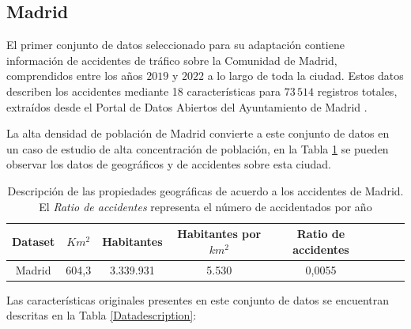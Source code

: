 \subsection*{Madrid}

El primer conjunto de datos seleccionado para su adaptación contiene información de accidentes de tráfico sobre la Comunidad de Madrid, comprendidos entre los años $2019$ y $2022$ a lo largo de toda la ciudad. Estos datos describen los accidentes mediante 18 características para $73\,514$ registros totales, extraídos desde el Portal de Datos Abiertos del Ayuntamiento de Madrid \cite{InfoDatasetMadrid}. 

La alta densidad de población de Madrid convierte a este conjunto de datos en un caso de estudio de alta concentración de población, en la Tabla \ref{Madrid_statistics} se pueden observar los datos de geográficos y de accidentes sobre esta ciudad.

\begin{table}[ht]
	\begin{center}
		\begin{tabular}{|c|c||c|c|c|c|c|c|}
			\hline
			\textbf{Dataset} & \textbf{$Km^2$} & \textbf{Habitantes} & \textbf{Habitantes por $km^2$} & \textbf{Ratio de accidentes}
			\\ \hline \hline
			
			Madrid & 604,3 & 3.339.931 & 5.530 & 0,0055 \\ \hline
			
		\end{tabular}
	\end{center}
	\caption[Descripción de las propiedades geográficas de acuerdo a los accidentes de Madrid]{Descripción de las propiedades geográficas de acuerdo a los accidentes de Madrid. El \textit{Ratio de accidentes} representa el número de accidentados por año}
	\label{Madrid_statistics}
\end{table}

Las características originales presentes en este conjunto de datos se encuentran descritas en la Tabla \ref{Datadescription}:


